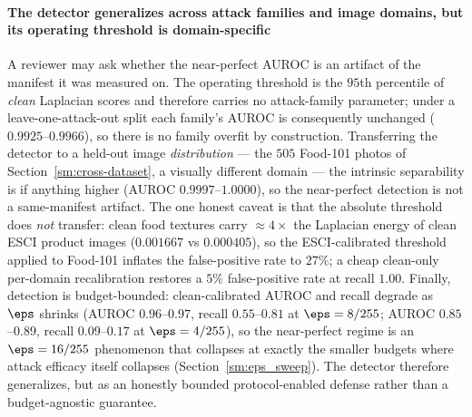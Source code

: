 \paragraph{The detector generalizes across attack families and image domains, but its operating threshold is domain-specific} A reviewer may ask whether the near-perfect AUROC is an artifact of the manifest it was measured on. The operating threshold is the $95$th percentile of \emph{clean} Laplacian scores and therefore carries no attack-family parameter; under a leave-one-attack-out split each family's AUROC is consequently unchanged ($0.9925$--$0.9966$), so there is no family overfit by construction. Transferring the detector to a held-out image \emph{distribution} --- the $505$ Food-101 photos of Section~\ref{sm:cross-dataset}, a visually different domain --- the intrinsic separability is if anything higher (AUROC $0.9997$--$1.0000$), so the near-perfect detection is not a same-manifest artifact. The one honest caveat is that the absolute threshold does \emph{not} transfer: clean food textures carry $\approx 4\times$ the Laplacian energy of clean ESCI product images ($0.001667$ vs $0.000405$), so the ESCI-calibrated threshold applied to Food-101 inflates the false-positive rate to $27\%$; a cheap clean-only per-domain recalibration restores a $5\%$ false-positive rate at recall $1.00$. Finally, detection is budget-bounded: clean-calibrated AUROC and recall degrade as $\eps$ shrinks (AUROC $0.96$--$0.97$, recall $0.55$--$0.81$ at $\eps = 8/255$; AUROC $0.85$--$0.89$, recall $0.09$--$0.17$ at $\eps = 4/255$), so the near-perfect regime is an $\eps = 16/255$ phenomenon that collapses at exactly the smaller budgets where attack efficacy itself collapses (Section~\ref{sm:eps_sweep}). The detector therefore generalizes, but as an honestly bounded protocol-enabled defense rather than a budget-agnostic guarantee.

